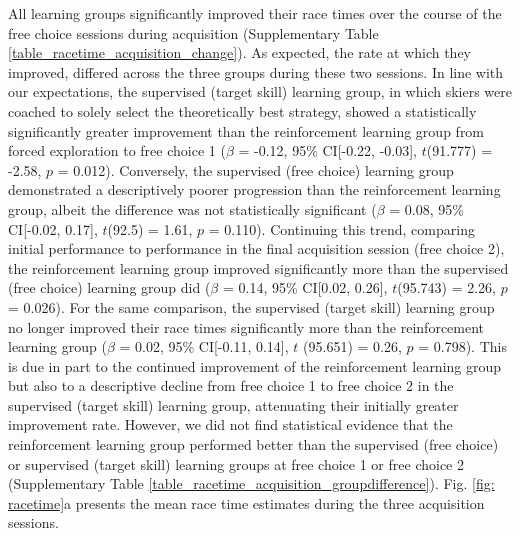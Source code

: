 \documentclass[pdflatex,sn-nature]{sn-jnl}%
\theoremstyle{thmstyleone}%
\theoremstyle{thmstyletwo}%
\theoremstyle{thmstylethree}%
\begin{document}
All learning groups significantly improved their race times over the course of the free choice sessions during acquisition (Supplementary Table \ref{table_racetime_acquisition_change}). As expected, the rate at which they improved, differed across the three groups during these two sessions. In line with our expectations, the supervised (target skill) learning group, in which skiers were coached to solely select the theoretically best strategy, showed a statistically significantly greater improvement than the reinforcement learning group from forced exploration to free choice 1  ($\beta$ = -0.12, 95\% CI[-0.22, -0.03], $t$(91.777) = -2.58, $p$ = 0.012). Conversely, the supervised (free choice) learning group demonstrated a descriptively poorer progression than the reinforcement learning group, albeit the difference was not statistically significant ($\beta$ = 0.08, 95\% CI[-0.02, 0.17], $t$(92.5) = 1.61, $p$ = 0.110). Continuing this trend, comparing initial performance to performance in the final acquisition session (free choice 2), the reinforcement learning group improved significantly more than the supervised (free choice) learning group did  ($\beta$ = 0.14, 95\% CI[0.02, 0.26], $t$(95.743) = 2.26, $p$ = 0.026). For the same comparison, the supervised (target skill) learning group no longer improved their race times significantly more than the reinforcement learning group ($\beta$
 = 0.02, 95\% CI[-0.11, 0.14], $t$
(95.651) = 0.26, $p$ = 0.798). This is due in part to the continued improvement of the reinforcement learning group but also to a descriptive decline from free choice 1 to free choice 2 in the supervised (target skill) learning group, attenuating their initially greater improvement rate. However, we did not find statistical evidence that the reinforcement learning group performed better than the supervised (free choice) or supervised (target skill) learning groups at free choice 1 or free choice 2 (Supplementary Table \ref{table_racetime_acquisition_groupdifference}). Fig. \ref{fig: racetime}a presents the mean race time estimates during the three acquisition sessions. 
\end{document}

